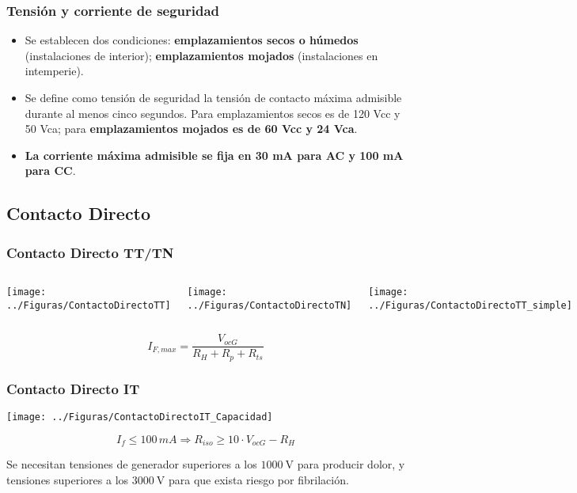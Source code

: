 \documentclass[serif, xcolor=dvipsnames]{beamer}
\begin{document}
\begin{frame}
\frametitle{Tensión y corriente de seguridad}
\begin{itemize}
\item Se establecen dos condiciones: \textbf{emplazamientos secos o húmedos}
(instalaciones de interior); \textbf{emplazamientos mojados} (instalaciones
en intemperie).
\item Se define como tensión de seguridad la tensión de contacto máxima
admisible durante al menos cinco segundos. Para emplazamientos secos
es de 120 Vcc y 50 Vca; para \textbf{emplazamientos mojados es de
60 Vcc y 24 Vca}.
\item \textbf{La corriente máxima admisible se fija en 30 mA para AC y 100
mA para CC}.
\end{itemize}

\end{frame}

\subsection{Contacto Directo}


\begin{frame}
\frametitle{Contacto Directo TT/TN}
\begin{columns}[t]%


\column{4cm}

\texttt{[image: ../Figuras/ContactoDirectoTT]} 


\column{4cm}

\texttt{[image: ../Figuras/ContactoDirectoTN]}


\column{3cm}

\texttt{[image: ../Figuras/ContactoDirectoTT\_simple]}

\end{columns}%
\[
I_{F,max}=\frac{V_{ocG}}{R_{H}+R_{p}+R_{ts}}\]



\end{frame}

\begin{frame}
\frametitle{Contacto Directo IT}

\begin{center}
\texttt{[image: ../Figuras/ContactoDirectoIT\_Capacidad]}
\par\end{center}

\[
I_{f}\leq100\, mA\Longrightarrow R_{iso}\geq10\cdot V_{ocG}-R_{H}\]


Se necesitan tensiones de generador superiores a los $\SI{1000}{\volt}$
para producir dolor, y tensiones superiores a los $\SI{3000}{\volt}$
para que exista riesgo por fibrilación.


\end{frame}
\end{document}
